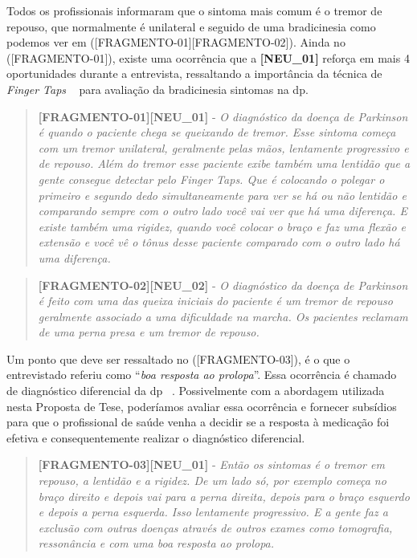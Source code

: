 Todos os profissionais informaram que o sintoma mais comum é o tremor de repouso, que normalmente é unilateral e seguido de uma bradicinesia como podemos ver em ([FRAGMENTO-01][FRAGMENTO-02]). Ainda no ([FRAGMENTO-01]), existe uma ocorrência que a \textbf{[NEU\_01]} reforça em mais 4 oportunidades durante a entrevista, ressaltando a importância da técnica de \textit{Finger Taps} ~\cite{updrs87} para avaliação da bradicinesia sintomas na \ac{dp}.


\begin{quote}
\textbf{[FRAGMENTO-01][NEU\_01]} -
\emph{O diagnóstico da doença de Parkinson é quando o paciente chega se queixando de tremor. Esse sintoma começa com um tremor unilateral, geralmente pelas mãos, lentamente progressivo e de repouso. Além do tremor esse paciente exibe também uma lentidão que a gente consegue detectar pelo \textit{Finger Taps}. Que é colocando o polegar o primeiro e segundo dedo simultaneamente para ver se há ou não lentidão e comparando sempre com o outro lado você vai ver que há uma diferença. E existe também uma rigidez, quando você colocar o braço e faz uma flexão e extensão e você vê o tônus desse paciente comparado com o outro lado há uma diferença.}
\end{quote}

\begin{quote}
\textbf{[FRAGMENTO-02][NEU\_02]} -
\emph{
O diagnóstico da doença de Parkinson é feito com uma das queixa iniciais do paciente é um tremor de repouso geralmente associado a uma dificuldade na marcha. Os pacientes reclamam de uma perna presa e um tremor de repouso. 
}
\end{quote}

Um ponto que deve ser ressaltado no  ([FRAGMENTO-03]), é o que o entrevistado referiu como ``\textit{boa resposta ao prolopa}''. Essa ocorrência é chamado de diagnóstico diferencial da \ac{dp} ~\cite{protpar010}. Possivelmente com a abordagem utilizada nesta Proposta de Tese, poderíamos avaliar essa ocorrência e fornecer subsídios para que o profissional de saúde venha a decidir se a resposta à medicação foi efetiva e consequentemente realizar o diagnóstico diferencial.

\begin{quote}
\textbf{[FRAGMENTO-03][NEU\_01]} - 
\emph{
Então os sintomas é o tremor em repouso, a lentidão e a rigidez. De um lado só, por exemplo começa no braço direito e depois vai para a perna direita, depois para o braço esquerdo e depois a perna esquerda. Isso lentamente progressivo. E a gente faz a exclusão com outras doenças através de outros exames como tomografia, ressonância e com uma boa resposta ao prolopa.
}
\end{quote}

